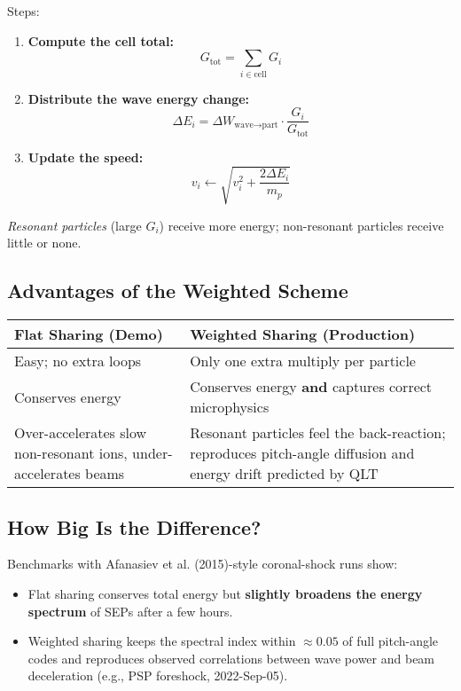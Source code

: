 \vspace{1em}
\noindent Steps:
\begin{enumerate}
  \item \textbf{Compute the cell total:}
    \[
    G_{\text{tot}} = \sum_{i \in \text{cell}} G_i
    \]
  \item \textbf{Distribute the wave energy change:}
    \[
    \Delta E_i = \Delta W_{\text{wave}\to\text{part}} \cdot \frac{G_i}{G_{\text{tot}}}
    \]
  \item \textbf{Update the speed:}
    \[
    v_i \leftarrow \sqrt{v_i^2 + \frac{2 \Delta E_i}{m_p}}
    \]
\end{enumerate}

\noindent \textit{Resonant particles} (large $G_i$) receive more energy; non-resonant particles receive little or none.

\subsection*{Advantages of the Weighted Scheme}

\begin{tabular}{|p{7cm}|p{7cm}|}
\hline
\textbf{Flat Sharing (Demo)} & \textbf{Weighted Sharing (Production)} \\
\hline
Easy; no extra loops & Only one extra multiply per particle \\
Conserves energy & Conserves energy \textbf{and} captures correct microphysics \\
Over-accelerates slow non-resonant ions, under-accelerates beams & Resonant particles feel the back-reaction; reproduces pitch-angle diffusion and energy drift predicted by QLT \\
\hline
\end{tabular}

\subsection*{How Big Is the Difference?}

Benchmarks with Afanasiev et al. (2015)-style coronal-shock runs show:

\begin{itemize}
  \item Flat sharing conserves total energy but \textbf{slightly broadens the energy spectrum} of SEPs after a few hours.
  \item Weighted sharing keeps the spectral index within $\approx 0.05$ of full pitch-angle codes and reproduces observed correlations between wave power and beam deceleration (e.g., PSP foreshock, 2022-Sep-05).
\end{itemize}


